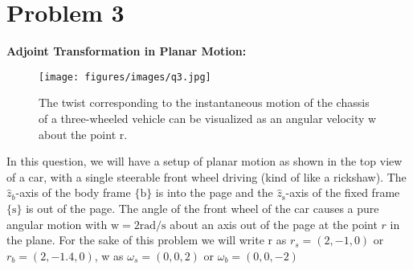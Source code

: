 \section*{Problem 3}
\setcounter{section}{3}
\setcounter{equation}{0}

\textbf{Adjoint Transformation in Planar Motion:}
\begin{figure}[h]
    \centering
    \texttt{[image: figures/images/q3.jpg]}
    \caption{
        The twist corresponding to the instantaneous motion of the chassis of a three-wheeled vehicle can be visualized as an angular velocity w about the point r.
    }
\end{figure}

In this question, we will have a setup of planar motion as shown in the top view of a car, with a single steerable front wheel driving (kind of like a rickshaw).
The \( \hat{z}_{b} \)-axis of the body frame \( \{ \mathrm{b} \} \) is into the page and the \( \hat{z}_{\mathrm{s}} \)-axis of the fixed frame \( \{ \mathrm{s} \} \) is out of the page.
The angle of the front wheel of the car causes a pure angular motion with \( \mathrm{w}=2 \mathrm{rad} / \mathrm{s} \) about an axis out of the page at the point \( r \) in the plane.
For the sake of this problem we will write r as \( r_{s}=(2,-1,0) \) or \( r_{b}=(2,-1.4,0) \), w as \( \omega_{s}=(0,0,2) \) or \( \omega_{b}=(0,0,-2) \)

